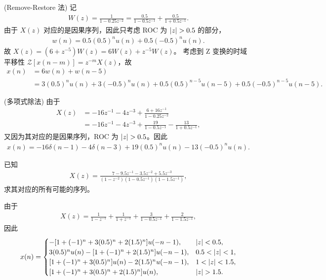 \begin{solution}
    (Remove-Restore 法)
    记
    \begin{align*}
        W(z) = \frac{1}{1 - 0.25z^{-2}} = \frac{0.5}{1 - 0.5z^{-1}} + \frac{0.5}{1 + 0.5z^{-1}}.
    \end{align*}
    由于 $X(z)$ 对应的是因果序列，因此只考虑 ROC 为 $\left|z\right| > 0.5$ 的部分，
    \begin{align*}
        w(n) = 0.5(0.5)^n u(n) + 0.5(-0.5)^n u(n).
    \end{align*}
    故 $X(z) = (6 + z^{-5})W(z) = 6W(z) + z^{-5}W(z)$。
    考虑到 Z 变换的时域平移性 $\mathcal{Z}[x(n-m)] = z^{-m}X(z)$，故
    \begin{align*}
        x(n) & = 6w(n) + w(n - 5) \\
        & = 3(0.5)^nu(n) + 3(-0.5)^nu(n) + 0.5(0.5)^{n-5}u(n-5) + 0.5(-0.5)^{n-5}u(n-5).
    \end{align*}
\end{solution}

\begin{solution}
    (多项式除法)
    由于
    \begin{align*}
        X(z) & = -16z^{-1} - 4z^{-3} + \frac{6 + 16z^{-1}}{1 - 0.25z^{-2}} \\
        & = -16z^{-1} - 4z^{-3} + \frac{19}{1 - 0.5z^{-1}} - \frac{13}{1 + 0.5z^{-1}},
    \end{align*}
    又因为其对应的是因果序列，ROC 为 $\left|z\right| > 0.5$。因此
    \begin{align*}
        x(n) = -16\delta(n - 1) - 4\delta(n - 3) + 19(0.5)^n u(n) - 13(-0.5)^n u(n).
    \end{align*}
\end{solution}

\begin{exercise}
    已知
    \begin{align*}
        X(z) = \frac{7 - 9.5z^{-1} - 3.5z^{-2} + 5.5z^{-3}}{(1 - z^{-2})(1 - 0.5z^{-1})(1 - 1.5z^{-1})},
    \end{align*}
    求其对应的所有可能的序列。
\end{exercise}

\begin{solution}
    由于
    \begin{align*}
        X(z) = \frac{1}{1 - z^{-1}} + \frac{1}{1 + z^{-1}} + \frac{3}{1 - 0.5z^{-1}} + \frac{2}{1 - 1.5z^{-1}},
    \end{align*}
    因此
    \begin{align*}
        x(n) = \begin{cases}
            -[1 + (-1)^n + 3(0.5)^n + 2(1.5)^n] u(-n-1), & \left|z\right| < 0.5, \\
            3(0.5)^n u(n) - [1 + (-1)^n + 2(1.5)^n] u(-n-1), & 0.5 < \left|z\right| < 1, \\
            [1 + (-1)^n + 3(0.5)^n] u(n) - 2(1.5)^n u(-n-1), & 1 < \left|z\right| < 1.5, \\
            [1 + (-1)^n + 3(0.5)^n + 2(1.5)^n] u(n), & \left|z\right| > 1.5.
        \end{cases}
    \end{align*}
\end{solution}

